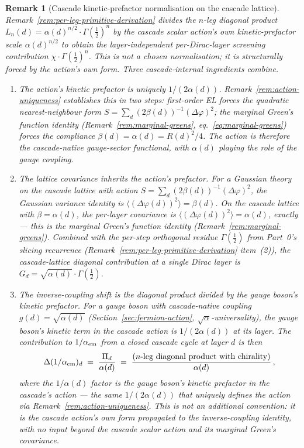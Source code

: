 \documentclass[12pt,a4paper]{article}
\newtheorem*{remark}{Remark}
\begin{document}
\begin{remark}[Cascade kinetic-prefactor normalisation on the cascade lattice]\label{rem:wavefunction-renorm-canonical}
Remark~\ref{rem:per-leg-primitive-derivation} divides the $n$-leg diagonal product $L_n(d) = \alpha(d)^{n/2}\cdot\Gamma(\tfrac{1}{2})^n$ by the cascade scalar action's own kinetic-prefactor scale $\alpha(d)^{n/2}$ to obtain the layer-independent per-Dirac-layer screening contribution $\chi\cdot\Gamma(\tfrac{1}{2})^n$. This is not a chosen normalisation; it is structurally forced by the action's own form. Three cascade-internal ingredients combine.
\begin{enumerate}[label=(\roman*),nosep]
\item \emph{The action's kinetic prefactor is uniquely $1/(2\alpha(d))$.} Remark~\ref{rem:action-uniqueness} establishes this in two steps: first-order EL forces the quadratic nearest-neighbour form $S = \sum_d (2\beta(d))^{-1}(\Delta\varphi)^2$; the marginal Green's function identity (Remark~\ref{rem:marginal-greens}, eq.~\eqref{eq:marginal-greens}) forces the compliance $\beta(d) = \alpha(d) = R(d)^2/4$. The action is therefore the cascade-native gauge-sector functional, with $\alpha(d)$ playing the role of the gauge coupling.
\item \emph{The lattice covariance inherits the action's prefactor.} For a Gaussian theory on the cascade lattice with action $S = \sum_d (2\beta(d))^{-1}(\Delta\varphi)^2$, the Gaussian variance identity is $\langle(\Delta\varphi(d))^2\rangle = \beta(d)$. On the cascade lattice with $\beta = \alpha(d)$, the per-layer covariance is $\langle(\Delta\varphi(d))^2\rangle = \alpha(d)$, exactly --- this is the marginal Green's function identity (Remark~\ref{rem:marginal-greens}). Combined with the per-step orthogonal residue $\Gamma(\tfrac{1}{2})$ from Part~0's slicing recurrence (Remark~\ref{rem:per-leg-primitive-derivation} item~(2)), the cascade-lattice diagonal contribution at a single Dirac layer is $G_d = \sqrt{\alpha(d)}\cdot\Gamma(\tfrac{1}{2})$.
\item \emph{The inverse-coupling shift is the diagonal product divided by the gauge boson's kinetic prefactor.} For a gauge boson with cascade-native coupling $g(d) = \sqrt{\alpha(d)}$ (Section~\ref{sec:fermion-action}, $\sqrt{\alpha}$-universality), the gauge boson's kinetic term in the cascade action is $1/(2\alpha(d))$ at its layer. The contribution to $1/\alpha_{\rm em}$ from a closed cascade cycle at layer $d$ is then
\[
\Delta(1/\alpha_{\rm em})_d \;=\; \frac{\Pi_d}{\alpha(d)} \;=\; \frac{(\text{$n$-leg diagonal product with chirality})}{\alpha(d)}\,,
\]
where the $1/\alpha(d)$ factor is the gauge boson's kinetic prefactor in the cascade's action --- the same $1/(2\alpha(d))$ that uniquely defines the action via Remark~\ref{rem:action-uniqueness}. This is not an additional convention: it is the cascade action's own form propagated to the inverse-coupling identity, with no input beyond the cascade scalar action and its marginal Green's covariance.
\end{enumerate}


\end{remark}
\end{document}
